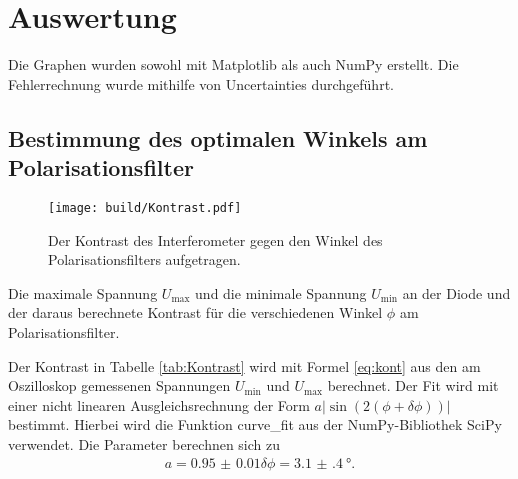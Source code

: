 \section{Auswertung}
\label{sec:Auswertung}
Die Graphen wurden sowohl mit Matplotlib \cite{matplotlib} als auch NumPy \cite{numpy} erstellt. Die
Fehlerrechnung wurde mithilfe von Uncertainties \cite{uncertainties} durchgeführt.
\subsection{Bestimmung des optimalen Winkels am Polarisationsfilter}
\begin{figure}
	\centering
	\texttt{[image: build/Kontrast.pdf]}
	\caption{Der Kontrast des Interferometer gegen den Winkel des Polarisationsfilters aufgetragen.}
\end{figure}
\begin{table}
	\centering
	\caption{Die maximale Spannung $U_\text{max}$ und die minimale Spannung $U_\text{min}$ an der Diode und der daraus berechnete Kontrast für die verschiedenen Winkel $\phi$ am Polarisationsfilter.}
	
\end{table}
Der Kontrast in Tabelle \ref{tab:Kontrast} wird mit Formel \eqref{eq:kont} aus den am Oszilloskop gemessenen Spannungen $U_\text{min}$ und $U_\text{max}$ berechnet. Der Fit wird mit einer nicht linearen Ausgleichsrechnung der Form $a |\sin(2(\phi+\delta\phi))|$ bestimmt. Hierbei wird die Funktion curve\_fit aus der NumPy-Bibliothek SciPy \cite{scipy} verwendet. Die Parameter berechnen sich zu
\begin{gather*}
a=\num{0.95(1)}
\delta\phi=\SI{3.1(4)}{\degree}.
\end{gather*}
